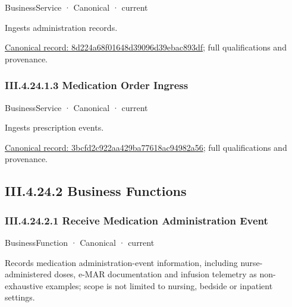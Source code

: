 \label{element:8d224a68f01648d39096d39ebac893df}
{\small BusinessService · Canonical · current}\par

Ingests administration records.


{\footnotesize \href{../../../../continuum/business/business-service/8d224a68f01648d39096d39ebac893df.md}{Canonical record: 8d224a68f01648d39096d39ebac893df}; full qualifications and provenance.}\par
\subsubsection*{III.4.24.1.3 Medication Order Ingress}
\label{navigation:III.4.24.1.3}

\label{element:3bcfd2c922aa429ba77618ac94982a56}
{\small BusinessService · Canonical · current}\par

Ingests prescription events.


{\footnotesize \href{../../../../continuum/business/business-service/3bcfd2c922aa429ba77618ac94982a56.md}{Canonical record: 3bcfd2c922aa429ba77618ac94982a56}; full qualifications and provenance.}\par
\subsection*{III.4.24.2 Business Functions}
\label{navigation:III.4.24.2}

\subsubsection*{III.4.24.2.1 Receive Medication Administration Event}
\label{navigation:III.4.24.2.1}

\label{element:7437a97ccc3947b38f70d7da47bd0714}
{\small BusinessFunction · Canonical · current}\par

Records medication administration-event information, including nurse-administered doses, e-MAR documentation and infusion telemetry as non-exhaustive examples; scope is not limited to nursing, bedside or inpatient settings.


